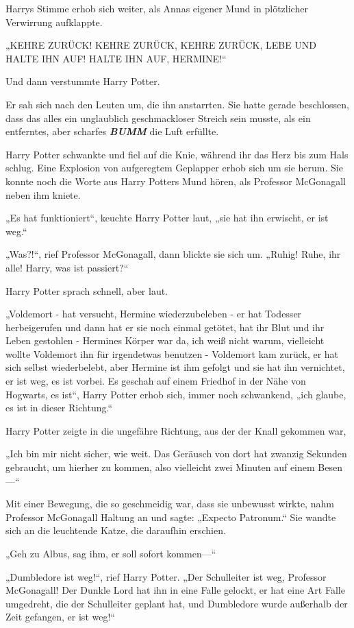 {Harrys Stimme erhob sich weiter, als Annas eigener Mund in plötzlicher Verwirrung aufklappte.

„KEHRE ZURÜCK! KEHRE ZURÜCK, KEHRE ZURÜCK, LEBE UND HALTE IHN AUF! HALTE IHN AUF, HERMINE!“

Und dann verstummte Harry Potter.

Er sah sich nach den Leuten um, die ihn anstarrten. Sie hatte gerade beschlossen, dass das alles ein unglaublich geschmackloser Streich sein musste, als ein entferntes, aber scharfes \textbf{\emph{BUMM}} die Luft erfüllte.

Harry Potter schwankte und fiel auf die Knie, während ihr das Herz bis zum Hals schlug. Eine Explosion von aufgeregtem Geplapper erhob sich um sie herum. Sie konnte noch die Worte aus Harry Potters Mund hören, als Professor McGonagall neben ihm kniete.

„Es hat funktioniert“, keuchte Harry Potter laut, „sie hat ihn erwischt, er ist weg.“

„Was?!“, rief Professor McGonagall, dann blickte sie sich um. „Ruhig! Ruhe, ihr alle! Harry, was ist passiert?“

Harry Potter sprach schnell, aber laut.

„Voldemort - hat versucht, Hermine wiederzubeleben - er hat Todesser herbeigerufen und dann hat er sie noch einmal getötet, hat ihr Blut und ihr Leben gestohlen - Hermines Körper war da, ich weiß nicht warum, vielleicht wollte Voldemort ihn für irgendetwas benutzen - Voldemort kam zurück, er hat sich selbst wiederbelebt, aber Hermine ist ihm gefolgt und sie hat ihn vernichtet, er ist weg, es ist vorbei. Es geschah auf einem Friedhof in der Nähe von Hogwarts, es ist“, Harry Potter erhob sich, immer noch schwankend, „ich glaube, es ist in dieser Richtung.“

Harry Potter zeigte in die ungefähre Richtung, aus der der Knall gekommen war,

„Ich bin mir nicht sicher, wie weit. Das Geräusch von dort hat zwanzig Sekunden gebraucht, um hierher zu kommen, also vielleicht zwei Minuten auf einem Besen—“

Mit einer Bewegung, die so geschmeidig war, dass sie unbewusst wirkte, nahm Professor McGonagall Haltung an und sagte: „Expecto Patronum.“ Sie wandte sich an die leuchtende Katze, die daraufhin erschien.

„Geh zu Albus, sag ihm, er soll sofort kommen—“

„Dumbledore ist weg!“, rief Harry Potter. „Der Schulleiter ist weg, Professor McGonagall! Der Dunkle Lord hat ihn in eine Falle gelockt, er hat eine Art Falle umgedreht, die der Schulleiter geplant hat, und Dumbledore wurde außerhalb der Zeit gefangen, er ist weg!“

}
